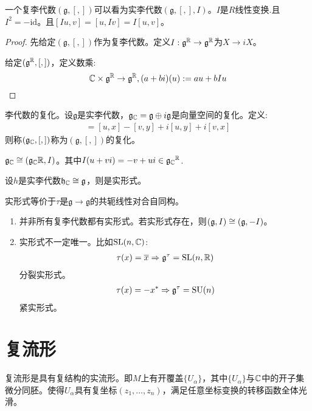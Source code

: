 \begin{proposition}
    一个复李代数$(\mathfrak{g},[,])$可以看为实李代数$(\mathfrak{g},[,],I)$。$I$是$R$线性变换.且$I^2=-\mathrm{id}$。且$[Iu,v]=[u,Iv]=I[u,v]$。
\end{proposition}
\begin{proof}
    先给定$(\mathfrak{g},[,])$作为复李代数。定义$I:\mathfrak{g}^{\mathbb{R}}\to \mathfrak{g}^{\mathbb{R}}$为$X \to iX$。

    给定$(\mathfrak{g}^{\mathbb{R}},[,])$，定义数乘:
    $$
    \mathbb{C} \times \mathfrak{g}^{\mathbb{R}} \to \mathfrak{g}^{\mathbb{R}},(a+bi)(u):=au+bIu
    $$
\end{proof}
李代数的复化。设$\mathfrak{g}$是实李代数，$\mathfrak{g}_{\mathbb{C}}=\mathfrak{g}\oplus i \mathfrak{g}$是向量空间的复化。定义:
\begin{align}
    [u+iv,x+iy]=[u,x]-[v,y]+i[u,y]+i[v,x]
\end{align}
则称$(\mathfrak{g}_{\mathbb{C}},[,])$称为$(\mathfrak{g},[,])$的复化。

\begin{proposition}
    $\mathfrak{g}_{\mathbb{C}}\cong ({\mathfrak{g}_{\mathbb{C}}}{\mathbb{R}},I)$。其中$I(u+vi)=-v+ui \in {\mathfrak{g}_{\mathbb{C}}}^{\mathbb{R}}$.
\end{proposition}
\begin{definition}[实形式]
    设$h$是实李代数$\mathfrak{h}_{\mathbb{C}}\cong \mathfrak{g}$，则是实形式。
\end{definition}
\begin{proposition}
    实形式等价于$\tau$是$\mathfrak{g} \to \mathfrak{g}$的共轭线性对合自同构。
\end{proposition}
\begin{remark}
    \begin{enumerate}
        \item 并非所有复李代数都有实形式。若实形式存在，则$(\mathfrak{g},I)\cong (\mathfrak{g},-I)$。
        \item 实形式不一定唯一。比如$\mathrm{SL}(n,\mathbb{C})$:
        \begin{align}
            \tau(x)=\overline{x} \Rightarrow \mathfrak{g}^{\tau}=\mathrm{SL}(n,\mathbb{R})
        \end{align}
        分裂实形式。
        \begin{align}
            \tau(x)=-x^* \Rightarrow \mathfrak{g}^\tau=\mathrm{SU}(n)
        \end{align}
        紧实形式。
    \end{enumerate}
\end{remark}
\section{复流形}
复流形是具有复结构的实流形。即$M$上有开覆盖$\{U_\alpha\}$，其中$\{U_\alpha\}$与$\mathbb{C}$中的开子集微分同胚。使得$U_\alpha$具有复坐标$(z_1,\dots,z_n)$，满足任意坐标变换的转移函数全体光滑。

